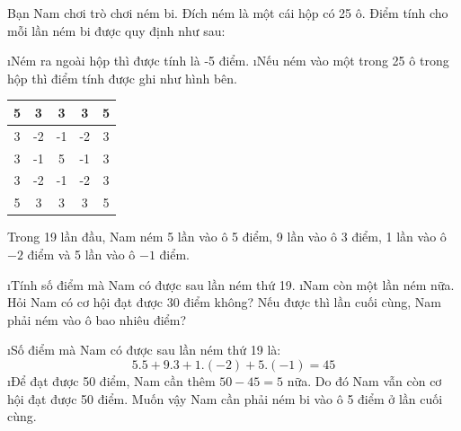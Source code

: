 \begin{bt}
	Bạn Nam chơi trò chơi ném bi. Đích ném là một cái  hộp có 25 ô. Điểm tính cho mỗi lần ném bi được quy định như sau:
	\begin{enumerate}[+,leftmargin=*]
		\i Ném ra ngoài hộp thì được tính là -5 điểm.
		\i Nếu ném vào một trong 25 ô trong hộp thì điểm tính được ghi như hình bên.
	\end{enumerate}
	\begin{center}
		\begin{tabular}{|c|c|c|c|c|}
			\hline
			5 &3&3&3&5\\
			\hline
			3&-2&-1&-2&3\\
			\hline
			3&-1&5&-1&3\\
			\hline
			3&-2&-1&-2&3\\
			\hline
			5&3&3&3&5\\
			\hline
		\end{tabular}
	\end{center}
	Trong 19 lần đầu, Nam ném 5 lần vào ô 5 điểm, 9 lần vào ô 3 điểm, 1 lần vào ô $-2$ điểm và 5 lần vào ô $-1$ điểm.
	\begin{enumerate}[a),leftmargin=*]
		\i Tính số điểm mà Nam có được sau  lần  ném  thứ 19.
		\i Nam còn một  lần ném nữa. Hỏi Nam có cơ hội đạt được 30 điểm không? Nếu được  thì  lần  cuối  cùng,  Nam phải ném vào ô bao nhiêu điểm?
	\end{enumerate}
	\begin{loigiaichuong41}
		\begin{enumerate}[a),leftmargin=*]
			\i	Số điểm mà Nam có được sau lần ném thứ 19 là:
			\[5.5 + 9.3 + 1.\left( { - 2} \right) + 5.\left( { - 1} \right) = 45\]
			\i	Để đạt được 50 điểm, Nam cần thêm $50-45 =5$ nữa. Do đó Nam vẫn còn cơ hội đạt được 50 điểm. Muốn vậy Nam cần phải ném bi vào ô 5 điểm ở lần cuối cùng. 
		\end{enumerate}
	\end{loigiaichuong41}
\end{bt}
